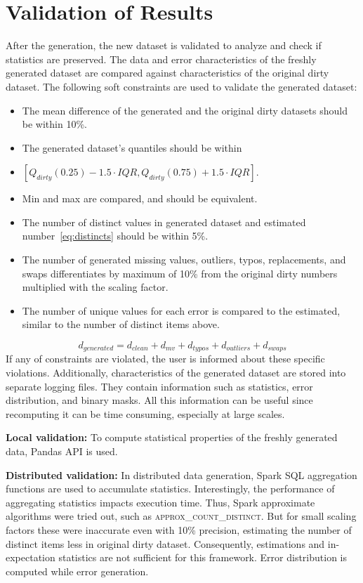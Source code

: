 \section{Validation of Results}
\label{sec:validation}
After the generation, the new dataset is validated to analyze and check if statistics are preserved. 
The data and error characteristics of the freshly generated dataset are compared against characteristics of the original dirty dataset.
The following soft constraints are used to validate the generated dataset:
\begin{itemize}
    \item The mean difference of the generated and the original dirty datasets should be within 10\%.
    \item The generated dataset's quantiles should be within 
    \item[~]$[Q_{dirty}(0.25) - 1.5\cdot IQR, Q_{dirty}(0.75) + 1.5\cdot IQR]$.
    \item Min and max are compared, and should be equivalent.
    \item The number of distinct values in generated dataset and estimated number~\ref{eq:distincts} should be within 5\%.
    \item The number of generated missing values, outliers, typos, replacements, and swaps differentiates by maximum  of 10\% from the original dirty numbers multiplied with the scaling factor.
    \item The number of unique values for each error is compared to the estimated, similar to the number of distinct items above.
\end{itemize}

\begin{equation}
\label{eq:distincts}
d_{generated} = d_{clean} + d_{mv} + d_{typos} + d_{outliers} + d_{swaps}
\end{equation}
If any of constraints are violated, the user is informed about these specific violations. 
Additionally, characteristics of the generated dataset are stored into separate logging files. 
They contain information such as statistics, error distribution, and binary masks.
All this information can be useful since recomputing it can be time consuming, especially at large scales.

\textbf{Local validation:} To compute statistical properties of the freshly generated data, Pandas API is used.

\textbf{Distributed validation:} 
In distributed data generation, Spark SQL aggregation functions are used to accumulate statistics.
Interestingly, the performance of aggregating statistics impacts execution time. 
Thus, Spark approximate algorithms were tried out, such as \textsc{approx\_count\_distinct}.
But for small scaling factors these were inaccurate even with 10\% precision, estimating the number of distinct items less in original dirty dataset.
Consequently, estimations and in-expectation statistics are not sufficient for this framework.
Error distribution is computed while error generation.